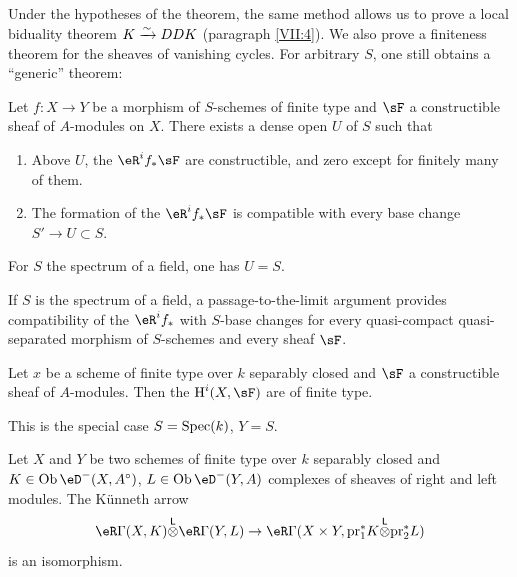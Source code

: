 \subsection{}\label{VII:1-8}

Under the hypotheses of the theorem, the same method allows us to
prove a local biduality theorem $K\xrightarrow\sim D D K$ (paragraph
\ref{VII:4}). We also prove a finiteness theorem for the
sheaves of vanishing cycles. For arbitrary $S$, one still obtains a
``generic'' theorem:




\begin{theorem_}\label{VII:1-9}
Let $f:X\to Y$ be a morphism of $S$-schemes of finite type and $\sF$ a
constructible sheaf of $A$-modules on $X$. There exists a dense open $U$ of $S$ such
that
\begin{enumerate}[\indent (i)]
  \item Above $U$, the $\eR^i f_\ast \sF$ are constructible, and zero
    except for finitely many of them.
  \item The formation of the $\eR^i f_\ast \sF$ is compatible with every
    base change $S' \to U\subset S$.
\end{enumerate}
\end{theorem_}

For $S$ the spectrum of a field, one has $U=S$.

If $S$ is the spectrum of a field, a passage-to-the-limit argument provides
compatibility of the $\eR^i f_\ast$ with $S$-base changes for every
quasi-compact quasi-separated morphism of $S$-schemes and every sheaf
$\sF$.




\begin{corollary_}\label{VII:1-10}
Let $x$ be a scheme of finite type over $k$ separably closed and $\sF$ a
constructible sheaf of $A$-modules. Then the $\h^i(X,\sF)$ are of finite
type.
\end{corollary_}

This is the special case $S=\operatorname{Spec}(k)$, $Y=S$.

\begin{corollary_}\label{VII:1-11}
Let $X$ and $Y$ be two schemes of finite type over $k$ separably closed and
$K\in \ob\eD^-(X,A^\circ)$, $L\in \ob\eD^-(Y,A)$ complexes of sheaves of
right and left modules. The K\"unneth arrow
\[
  \eR \Gamma(X,K) \lotimes \eR \Gamma(Y,L) \to \eR\Gamma(X\times Y,\pr_1^\ast K \lotimes \pr_2^\ast L)
\]
is an isomorphism.
\end{corollary_}

